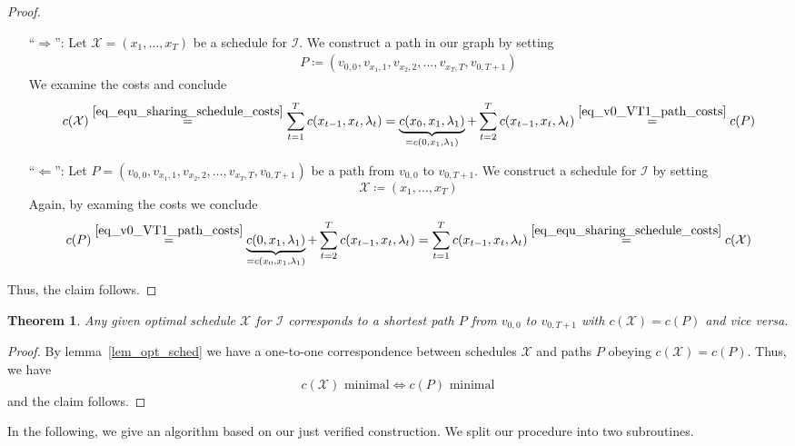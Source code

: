 \documentclass[hidelinks]{article}
\theoremstyle{plain}
\newtheorem{thm}{Theorem}[section]
\theoremstyle{definition}
\theoremstyle{rem}
\newcommand{\mx}{\mathcal{X}}
\newcommand{\inp}{\mathcal{I}}
\newcommand{\costs}{c}
\begin{document}
\begin{proof}
$ $
\begin{itemize}
\item[``$\Rightarrow$'':] Let $\mx=(x_1,\ldots,x_T)$ be a schedule for $\inp$. We construct a path in our graph by setting
\begin{align*}
	P\coloneqq(v_{0,0},v_{x_1,1},v_{x_2,2},\ldots,v_{x_T,T},v_{0,T+1})
\end{align*}
We examine the costs and conclude
\begin{equation*}
	\costs(\mx)\stackrel{\eqref{eq_equ_sharing_schedule_costs}}{=}\sum\limits_{t=1}^{T}\costs(x_{t-1},x_{t},\lambda_t)=\underbrace{\costs(x_0,x_1,\lambda_1)}_{=\costs(0,x_1,\lambda_1)}+\sum\limits_{t=2}^{T}\costs(x_{t-1},x_{t},\lambda_t)\stackrel{\eqref{eq_v0_VT1_path_costs}}{=}\costs(P)
\end{equation*}

\item[``$\Leftarrow$'':] Let $P=(v_{0,0},v_{x_1,1},v_{x_2,2},\ldots,v_{x_T,T},v_{0,T+1})$ be a path from $v_{0,0}$ to $v_{0,T+1}$.
We construct a schedule for $\inp$ by setting 
\begin{equation*}
	\mx\coloneqq(x_1,\ldots,x_T)
\end{equation*}
Again, by examing the costs we conclude
\begin{equation*}
	\costs(P)\stackrel{\eqref{eq_v0_VT1_path_costs}}{=}\underbrace{\costs(0,x_1,\lambda_1)}_{=\costs(x_0,x_1,\lambda_1)}+\sum\limits_{t=2}^{T}\costs(x_{t-1},x_{t},\lambda_t)=\sum\limits_{t=1}^{T}\costs(x_{t-1},x_{t},\lambda_t)\stackrel{\eqref{eq_equ_sharing_schedule_costs}}{=}\costs(\mx)
\end{equation*}
\end{itemize}
Thus, the claim follows.
\end{proof}
\begin{thm}
Any given optimal schedule $\mx$ for $\inp$ corresponds to a shortest path $P$ from $v_{0,0}$ to $v_{0,T+1}$ with $\costs(\mx)=\costs(P)$ and vice versa.
\end{thm} 
\begin{proof}
By lemma~\ref{lem_opt_sched} we have a one-to-one correspondence between schedules $\mx$ and paths $P$ obeying $\costs(\mx)=\costs(P)$. Thus, we have 
\begin{equation*}
	\costs(\mx)\text{ minimal}\iff \costs(P)\text{ minimal}
\end{equation*}
and the claim follows.
\end{proof}
In the following, we give an algorithm based on our just verified construction. 
We split our procedure into two subroutines. 
\end{document}
